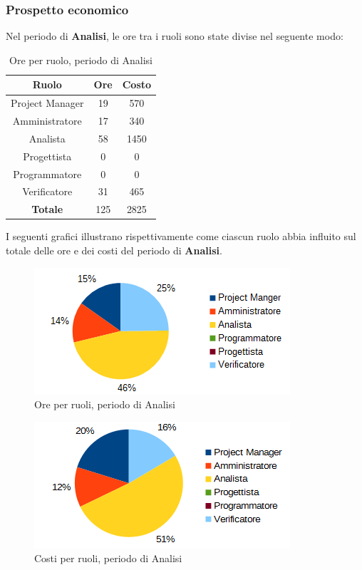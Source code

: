 		\subsubsection{Prospetto economico}
		Nel periodo di \textbf{Analisi}, le ore tra i ruoli sono state divise nel seguente modo: \\
	\begin{table}[H]
		\centering
		\begin{tabular}{|c|c|c|}
			\hline
			\textbf{Ruolo}		& \textbf{Ore}	& \textbf{Costo} \\
			\hline
			Project Manager		& 19			& 570	\\
			Amministratore		& 17			& 340	\\
			Analista			& 58			& 1450	\\
			Progettista			& 0				& 0	\\
			Programmatore		& 0				& 0	\\
			Verificatore		& 31			& 465	\\
			\hline
			\textbf{Totale}		& 125			& 2825	\\
			\hline
		\end{tabular}
		\caption{Ore per ruolo, periodo di Analisi}
		\end{table}
	I seguenti grafici illustrano rispettivamente come ciascun ruolo abbia influito sul totale
delle ore e dei costi del periodo di \textbf{Analisi}. \\
	\begin{figure}[H]
		\centering
		\includegraphics[scale=1]{immagini/grafici/analisi-torta.png}
		\caption{Ore per ruoli, periodo di Analisi}
	\end{figure}
	\begin{figure}[H]
		\centering
		\includegraphics[scale=1]{immagini/grafici/analisi-torta-costo.png}
		\caption{Costi per ruoli, periodo di Analisi}
	\end{figure}

